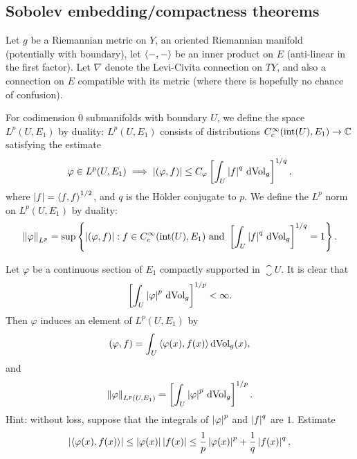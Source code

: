 \subsection*{Sobolev embedding/compactness theorems}
\begin{defn}
  Let $g$ be a Riemannian metric on $Y$, an oriented Riemannian manifold (potentially with boundary), let $\left\langle-,-\right\rangle$ be an inner product on $E$ (anti-linear in the first factor). Let $\nabla$ denote the Levi-Civita connection on $TY$, and also a connection on $E$ compatible with its metric (where there is hopefully no chance of confusion).

  For codimension $0$ submanifolds with boundary $U$, we define the space $L^{p}(U,E_{1})$ by duality: $L^{p}(U,E_{1})$ consists of distributions $C^{\infty}_{c}(\text{int}(U),E_{1})\to \mathbb{C}$ satisfying the estimate
  \begin{equation*}
    \varphi \in L^{p}(U,E_{1})\implies \left|(\varphi,f)\right|\le C_{\varphi}\left[\int_{U}\left|f\right|^{q}\,\mathrm{dVol}_{g}\right]^{1/q},
  \end{equation*}
  where $\left|f\right|=\left\langle f,f\right\rangle^{1/2}$, and $q$ is the H\"older conjugate to $p$. We define the $L^{p}$ norm on $L^{p}(U,E_{1})$ by duality:
  \begin{equation*}
    \left\lVert\varphi\right\rVert_{L^{p}}=\sup\left\{\left|(\varphi,f)\right|: f\in C^{\infty}_{c}(\text{int}(U),E_{1})\text{ and }\left[\int_{U}\left|f\right|^{q}\,\mathrm{dVol}_{g}\right]^{1/q}=1\right\}.
  \end{equation*}
  \begin{xca}
    Let $\varphi$ be a continuous section of $E_{1}$ compactly supported in $\closure{U}$. It is clear that
    \begin{equation*}
      \left[\int_{U}\left|\varphi\right|^{p}\,\mathrm{dVol}_{g}\right]^{1/p}<\infty.
    \end{equation*}
    Then $\varphi$ induces an element of $L^{p}(U,E_{1})$ by
    \begin{equation*}
      (\varphi,f)=\int_{U}\left\langle\varphi(x),f(x)\right\rangle\mathrm{dVol}_{g}(x),
    \end{equation*}
    and
    \begin{equation*}
      \left\lVert\varphi\right\rVert_{L^{p}(U,E_{1})}= \left[\int_{U}\left|\varphi\right|^{p}\,\mathrm{dVol}_{g}\right]^{1/p}.
    \end{equation*}
    Hint: without loss, suppose that the integrals of $\left|\varphi\right|^{p}$ and $\left|f\right|^{q}$ are $1$. Estimate
    \begin{equation*}
      \abs{\ip{\varphi(x),f(x)}}\le \abs{\varphi(x)}\abs{f(x)}\le \frac{1}{p}\abs{\varphi(x)}^{p}+\frac{1}{q}\abs{f(x)}^{q},

\end{equation*}
\end{xca}
\end{defn}
